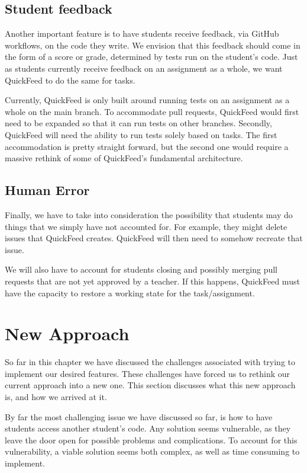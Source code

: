 
\subsection{Student feedback}

Another important feature is to have students receive feedback, via GitHub workflows, on the code they write.
We envision that this feedback should come in the form of a score or grade, determined by tests run on the student's code.
Just as students currently receive feedback on an assignment as a whole, we want QuickFeed to do the same for tasks.

Currently, QuickFeed is only built around running tests on an assignment as a whole on the main branch.
To accommodate pull requests, QuickFeed would first need to be expanded so that it can run tests on other branches.
Secondly, QuickFeed will need the ability to run tests solely based on tasks.
The first accommodation is pretty straight forward, but the second one would require a massive rethink of some of QuickFeed's fundamental architecture.

\subsection{Human Error}

Finally, we have to take into consideration the possibility that students may do things that we simply have not accounted for.
For example, they might delete issues that QuickFeed creates.
QuickFeed will then need to somehow recreate that issue.

We will also have to account for students closing and possibly merging pull requests that are not yet approved by a teacher.
If this happens, QuickFeed must have the capacity to restore a working state for the task/assignment.

\section{New Approach}

So far in this chapter we have discussed the challenges associated with trying to implement our desired features.
These challenges have forced us to rethink our current approach into a new one.
This section discusses what this new approach is, and how we arrived at it.

By far the most challenging issue we have discussed so far, is how to have students access another student's code.
Any solution seems vulnerable, as they leave the door open for possible problems and complications.
To account for this vulnerability, a viable solution seems both complex, as well as time consuming to implement.

